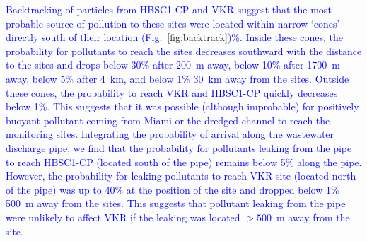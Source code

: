 \documentclass[preprint,12pt,authoryear]{elsarticle}
\newcommand{\modif}[1]{\textcolor{blue}{#1}}
\begin{document}
\modif{Backtracking of particles from HBSC1-CP and VKR suggest that the most probable source of pollution to these sites were located within narrow `cones' directly south of their location (Fig.~\ref{fig:backtrack})\%. Inside these cones, the probability for pollutants to reach the sites decreases southward with the distance to the sites and drops below 30\% after 200~m away, below 10\% after 1700~m away, below 5\% after 4~km, and below 1\%  30~km away from the sites. Outside these cones, the probability to reach VKR and HBSC1-CP quickly decreases below 1\%. This suggests that it was possible (although improbable) for positively buoyant pollutant coming from Miami or the dredged channel to reach the monitoring sites. Integrating the probability of arrival along the wastewater discharge pipe, we find that the probability for pollutants leaking from the pipe to reach HBSC1-CP (located south of the pipe) remains below 5\% along the pipe. However, the probability for leaking pollutants to reach VKR site (located north of the pipe) was up to 40\% at the position of the site and dropped below 1\% 500~m away from the sites. This suggests that pollutant leaking from the pipe were unlikely to affect VKR if the leaking was located $>500$~m away from the site.}

\end{document}
